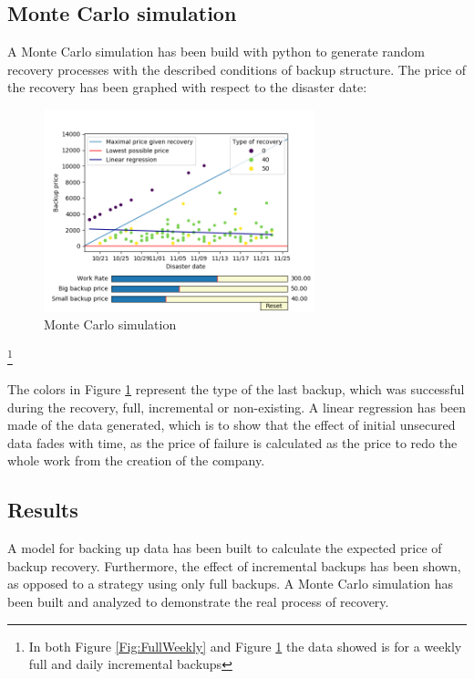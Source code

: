 \documentclass[11pt, a4paper]{article}
\theoremstyle{definition}
\newcommand\blfootnote[1]{%
	\begingroup
	\renewcommand\thefootnote{}\footnote{#1}%
	\addtocounter{footnote}{-1}%
	\endgroup
}
\begin{document}
		\subsection{Monte Carlo simulation}
			A Monte Carlo simulation has been build with python to generate random recovery processes with the described conditions of backup structure. The price of the recovery has been graphed with respect to the disaster date:
			\begin{figure}[H]
				\begin{minipage}{1.0\textwidth}
					\centering
					\includegraphics[width=0.7\textwidth]{"Weekly_full_carlo"}
					\caption{Monte Carlo simulation}\label{Fig:MonteCarlo}
				\end{minipage}
			\end{figure}
		\blfootnote{In both Figure \ref{Fig:FullWeekly} and Figure \ref{Fig:MonteCarlo} the data showed is for a weekly full and daily incremental backups}
		The colors in Figure \ref{Fig:MonteCarlo} represent the type of the last backup, which was successful during the recovery, full, incremental or non-existing.
		\newpage
		A linear regression has been made of the data generated, which is to show that the effect of initial unsecured data fades with time, as the price of failure is calculated as the price to redo the whole work from the creation of the company.
		\subsection{Results}
			A model for backing up data has been built to calculate the expected price of backup recovery. Furthermore, the effect of incremental backups has been shown, as opposed to a strategy using only full backups. A Monte Carlo simulation has been built and analyzed to demonstrate the real process of recovery.
\end{document}
